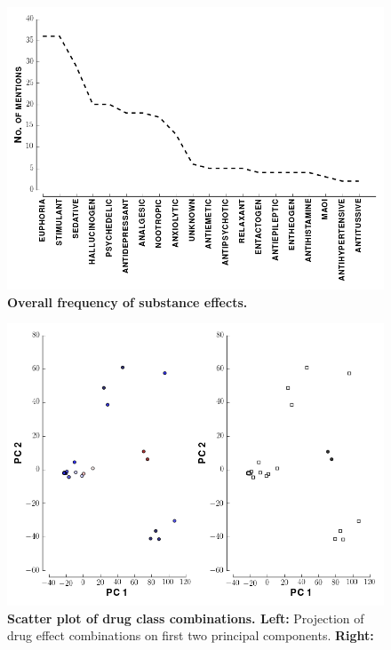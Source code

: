 \documentclass{article}
\begin{document}
\begin{figure}[h]
\centering
\includegraphics[scale=0.65]{effect-frequency.png}
\caption{\textbf{Overall frequency of substance effects.}}
\label{fig:effect-f}
\end{figure}

\begin{figure}[h]
\centering
\includegraphics[scale=0.65]{effect-matrix-w-clusters.png}
\caption{\textbf{Scatter plot of drug class combinations. Left: }Projection of drug effect combinations on first two principal components. \textbf{Right:}}
\label{fig:pca}
\end{figure}



\end{document}
